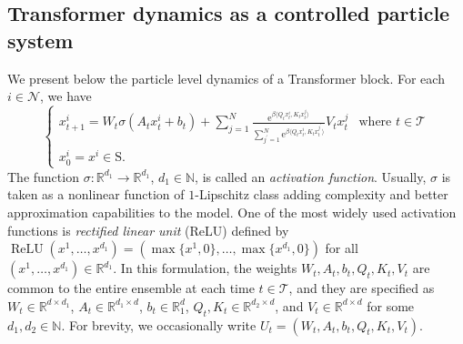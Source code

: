 \documentclass[11pt]{article}
\newcommand{\RR}{\mathbb{R}}
\newcommand{\NN}{\mathbb{N}}
\newcommand{\cN}{\mathcal{N}}
\newcommand{\cT}{\mathcal{T}}
\newcommand{\inner}[2]{\langle#1, #2\rangle}
\newcommand{\e}{\mathrm{e}} %
\begin{document}
\subsection{Transformer dynamics as a controlled particle system}
We present below the particle level dynamics of a Transformer block. For each $i\in\cN$, we have
\begin{equation}\label{eq:dynamics}
    \begin{cases}
        \displaystyle x_{t+1}^i = W_t\sigma(A_tx_t^i + b_t) + \sum_{j=1}^N \frac{ \e^{\beta\inner{Q_tx_t^i}{K_tx_t^j}}}{\sum_{j^\prime=1}^N\e^{\beta\inner{Q_tx_t^i}{K_tx_t^{j^\prime}}}}V_tx_t^j & \text{where } t\in\cT \\
        \displaystyle x^i_0 = x^i \in \mathrm{S}.
    \end{cases}
\end{equation}
The function $\sigma:\RR^{d_1}\to\RR^{d_1}$, $d_1\in\NN$, is called an \emph{activation function}. Usually, $\sigma$ is taken as a nonlinear function of $1$-Lipschitz class adding complexity and better approximation capabilities to the model. One of the most widely used activation functions is \emph{rectified linear unit} (ReLU) defined by $\operatorname{ReLU}(x^1,\ldots,x^{d_1}) = (\max\{x^1, 0\},\ldots,\max\{x^{d_1}, 0\})$ for all $(x^1,\ldots,x^{d_1})\in\RR^{d_1}$. In this formulation, the weights $W_t,A_t,b_t,Q_t,K_t,V_t$ are common to the entire ensemble at each time $t\in\cT$, and they are specified as $W_t\in\RR^{d\times d_1}$, $A_t\in\RR^{d_1\times d}$, $b_t\in\RR^d_1$, $Q_t, K_t\in\RR^{d_2\times d}$, and $V_t\in\RR^{d\times d}$ for some $d_1,d_2\in\NN$. For brevity, we occasionally write $U_t = (W_t,A_t,b_t,Q_t,K_t,V_t)$.
\end{document}
